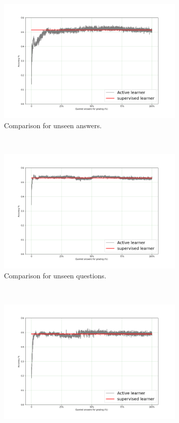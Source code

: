 \begin{figure}[!htb]
	\begin{subfigure}[b]{0.44\textwidth}
		\includegraphics[width=\textwidth]{images/Unseen_Answers}
		\caption{Comparison for unseen answers.}
		\label{unseen_ans}
	\end{subfigure}
	~
	\begin{subfigure}[b]{0.44\textwidth}
		\includegraphics[width=\textwidth]{images/Unseen_Questions}
		\caption{Comparison for unseen questions.}
		\label{unseen_ques}
	\end{subfigure}
	~
	\centering
	\begin{subfigure}[b]{0.44\textwidth}
		\includegraphics[width=\textwidth]{images/Unseen_Domain}

\end{subfigure}
\end{figure}

